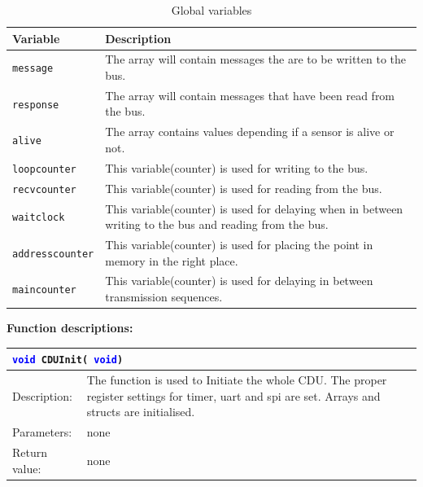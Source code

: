 \begin{table}[H]
\begin{tabular}{|l|p{10cm}|}
\hline
\cellcolor[gray]{0.8}\textbf{Variable} &\cellcolor[gray]{0.8} \textbf{Description}\\ \hline
\texttt{message} & The array will contain messages the are to be written to the bus.\\ 
\hline
\texttt{response} & The array will contain messages that have been read from the bus.\\ 
\hline
\texttt{alive} & The array contains values depending if a sensor is alive or not.\\ 
\hline
\texttt{loopcounter} & This variable(counter) is used for writing to the bus.\\ 
\hline
\texttt{recvcounter} & This variable(counter) is used for reading from the bus.\\ 
\hline
\texttt{waitclock} & This variable(counter) is used for delaying when in between writing to the bus and reading from the bus.\\ 
\hline
\texttt{addresscounter} & This variable(counter) is used for placing the point in memory in the right place.\\ 
\hline
\texttt{maincounter} & This variable(counter) is used for delaying in between transmission sequences.\\ 
\hline
\end{tabular}
\label{tab:globalvar}
\caption{Global variables}
\end{table}


\textbf{Function descriptions:}\\

\begin{table}[H]
\begin{tabular}{l p{12.5cm}}
\multicolumn{2}{l}{\texttt{\textcolor{blue}{void} CDUInit( \texttt{\textcolor{blue}{void}})}} \\
\hline
Description:& The function is used to Initiate the whole CDU. The proper register settings for timer, uart and spi are set. Arrays and structs are initialised.\\
Parameters:&none\\
Return value:&none\\
\end{tabular}
\end{table}

